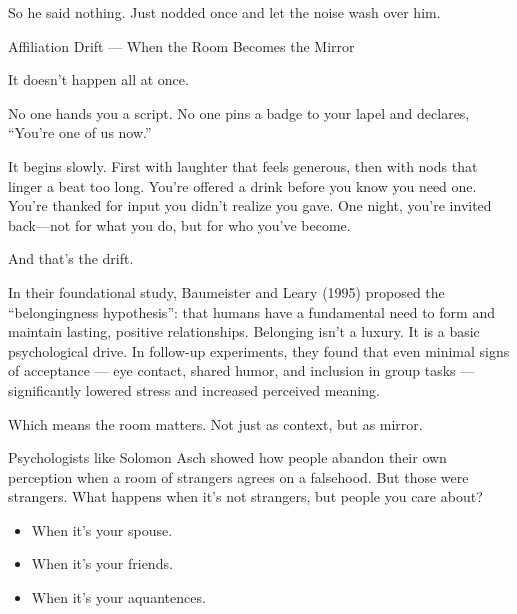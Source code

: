 So he said nothing. Just nodded once and let the noise wash over him.

\medskip

\begin{PsychologicalSidebar}{Affiliation Drift --- When the Room Becomes the Mirror}

    It doesn’t happen all at once.
    
    \medskip
    
    No one hands you a script. No one pins a badge to your lapel and declares, “You’re one of us now.”
    
    \medskip
    
    It begins slowly. First with laughter that feels generous, then with nods that linger a beat too long.
    You’re offered a drink before you know you need one. You're thanked for input you didn’t realize you gave.
    One night, you're invited back—not for what you do, but for who you’ve become.
    
    \medskip
    
    And that’s the drift.
    
    \medskip
    
    In their foundational study, Baumeister and Leary (1995) proposed the “belongingness hypothesis”: 
    that humans have a fundamental need to form and maintain lasting, positive relationships. Belonging 
    isn’t a luxury. It is a basic psychological drive. In follow-up experiments, they found that even 
    minimal signs of acceptance --- eye contact, shared humor, and inclusion in group tasks --- significantly 
    lowered stress and increased perceived meaning.
    
    \medskip
    
    Which means the room matters.
    Not just as context, but as mirror.
    
    \medskip
    
    Psychologists like Solomon Asch showed how people abandon their own perception when a room of 
    strangers agrees on a falsehood. But those were strangers. What happens when it’s not strangers, 
    but people you care about?
    
    \begin{itemize}
        \item When it’s your spouse.
        \item When it’s your friends.
        \item When it’s your aquantences.
    \end{itemize}
    

\end{PsychologicalSidebar}
